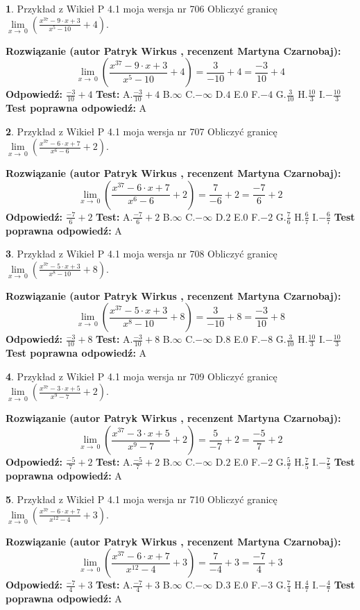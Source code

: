 \documentclass[12pt, a4paper]{article}
\theoremstyle{definition} %
\newtheorem{zad}{}
\newcommand{\zadStart}[1]{\begin{zad}#1\newline}
\newcommand{\zadStop}{\end{zad}}
\newcommand{\rozwStart}[2]{\noindent \textbf{Rozwiązanie (autor #1 , recenzent #2): }\newline}
\newcommand{\rozwStop}{\newline}
\newcommand{\odpStart}{\noindent \textbf{Odpowiedź:}\newline}
\newcommand{\odpStop}{\newline}
\newcommand{\testStart}{\noindent \textbf{Test:}\newline}
\newcommand{\testStop}{\newline}
\newcommand{\kluczStart}{\noindent \textbf{Test poprawna odpowiedź:}\newline}
\newcommand{\kluczStop}{\newline}
\begin{document}
\zadStart{Przykład z Wikieł P 4.1 moja wersja nr 706}
Obliczyć granicę $\lim\limits_{x\to\ 0}(\frac{x^{37}-9 \cdot x +3}{x^{5}-10}+4)$.
\zadStop
\rozwStart{Patryk Wirkus}{Martyna Czarnobaj}
$$\lim\limits_{x\to\ 0}(\frac{x^{37}-9 \cdot x +3}{x^{5}-10}+4)=\frac{3}{-10}+4=\frac{-3}{10}+4$$
\rozwStop
\odpStart
$\frac{-3}{10}+4$
\odpStop
\testStart
A.$\frac{-3}{10}+4$
B.$\infty$
C.$-\infty$
D.$4$
E.$0$
F.$-4$
G.$\frac{3}{10}$
H.$\frac{10}{3}$
I.$-\frac{10}{3}$
\testStop
\kluczStart
A
\kluczStop



\zadStart{Przykład z Wikieł P 4.1 moja wersja nr 707}
Obliczyć granicę $\lim\limits_{x\to\ 0}(\frac{x^{37}-6 \cdot x +7}{x^{6}-6}+2)$.
\zadStop
\rozwStart{Patryk Wirkus}{Martyna Czarnobaj}
$$\lim\limits_{x\to\ 0}(\frac{x^{37}-6 \cdot x +7}{x^{6}-6}+2)=\frac{7}{-6}+2=\frac{-7}{6}+2$$
\rozwStop
\odpStart
$\frac{-7}{6}+2$
\odpStop
\testStart
A.$\frac{-7}{6}+2$
B.$\infty$
C.$-\infty$
D.$2$
E.$0$
F.$-2$
G.$\frac{7}{6}$
H.$\frac{6}{7}$
I.$-\frac{6}{7}$
\testStop
\kluczStart
A
\kluczStop



\zadStart{Przykład z Wikieł P 4.1 moja wersja nr 708}
Obliczyć granicę $\lim\limits_{x\to\ 0}(\frac{x^{37}-5 \cdot x +3}{x^{8}-10}+8)$.
\zadStop
\rozwStart{Patryk Wirkus}{Martyna Czarnobaj}
$$\lim\limits_{x\to\ 0}(\frac{x^{37}-5 \cdot x +3}{x^{8}-10}+8)=\frac{3}{-10}+8=\frac{-3}{10}+8$$
\rozwStop
\odpStart
$\frac{-3}{10}+8$
\odpStop
\testStart
A.$\frac{-3}{10}+8$
B.$\infty$
C.$-\infty$
D.$8$
E.$0$
F.$-8$
G.$\frac{3}{10}$
H.$\frac{10}{3}$
I.$-\frac{10}{3}$
\testStop
\kluczStart
A
\kluczStop



\zadStart{Przykład z Wikieł P 4.1 moja wersja nr 709}
Obliczyć granicę $\lim\limits_{x\to\ 0}(\frac{x^{37}-3 \cdot x +5}{x^{9}-7}+2)$.
\zadStop
\rozwStart{Patryk Wirkus}{Martyna Czarnobaj}
$$\lim\limits_{x\to\ 0}(\frac{x^{37}-3 \cdot x +5}{x^{9}-7}+2)=\frac{5}{-7}+2=\frac{-5}{7}+2$$
\rozwStop
\odpStart
$\frac{-5}{7}+2$
\odpStop
\testStart
A.$\frac{-5}{7}+2$
B.$\infty$
C.$-\infty$
D.$2$
E.$0$
F.$-2$
G.$\frac{5}{7}$
H.$\frac{7}{5}$
I.$-\frac{7}{5}$
\testStop
\kluczStart
A
\kluczStop



\zadStart{Przykład z Wikieł P 4.1 moja wersja nr 710}
Obliczyć granicę $\lim\limits_{x\to\ 0}(\frac{x^{37}-6 \cdot x +7}{x^{12}-4}+3)$.
\zadStop
\rozwStart{Patryk Wirkus}{Martyna Czarnobaj}
$$\lim\limits_{x\to\ 0}(\frac{x^{37}-6 \cdot x +7}{x^{12}-4}+3)=\frac{7}{-4}+3=\frac{-7}{4}+3$$
\rozwStop
\odpStart
$\frac{-7}{4}+3$
\odpStop
\testStart
A.$\frac{-7}{4}+3$
B.$\infty$
C.$-\infty$
D.$3$
E.$0$
F.$-3$
G.$\frac{7}{4}$
H.$\frac{4}{7}$
I.$-\frac{4}{7}$
\testStop
\kluczStart
A
\kluczStop
\end{document}
